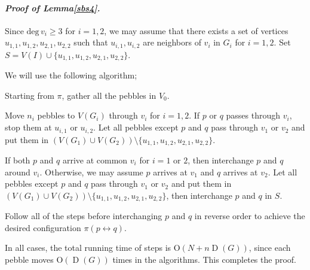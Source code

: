 \documentclass[letter,11pt]{article}
\newcommand{\white}{\qquad{\framebox{\rule{0pt}{4pt}}}}
\newcommand{\owari}{\hfill\white}
\theoremstyle{definition}
\theoremstyle{definition}
\DeclareMathOperator{\D}{D}
\newcommand{\1}{\boldmath$~1~$\unboldmath}
\newcommand{\Ord}{\mathrm{O}}
\newcommand{\qedgo}{\vspace{0.35cm}}
\newcommand{\tume}{\hspace*{0.2em}}
\def\deg{\textrm{deg}}
\newcommand{\maru}[1]{{\ooalign{\hfill$\small#1$\hfill\crcr\scalebox{1.3}{$\bigcirc$}}}}
\newenvironment{alg-enumerate}{%
  \begin{enumerate}%
   \renewcommand{\theenumi}{\arabic{enumi}}%
   \renewcommand{\labelenumi}{\rm{{\maru{\theenumi}}\tume\/}}%
   \renewcommand{\labelenumii}{\rm{$(${\maru{\theenumi}}-\theenumii$)$\tume\/}}%
 }{\end{enumerate}%
}
\newenvironment{Proofof}[1]{\expandafter
\paragraph{{\it Proof of #1.}}}{\hspace{5mm}\owari\qedgo}
\begin{document}
\begin{Proofof}{Lemma\tume\ref{sbs4}}
Since $\deg \, v_i \ge 3$ for $i=1,2$, we may assume that there exists a set of vertices $u_{1,1}, u_{1,2}, u_{2,1}, u_{2,2}$ such that $u_{i,1}, u_{i,2}$ are neighbors of $v_i$ in $G_i$ for $i=1,2$.
Set $S = V(I) \cup \{ u_{1,1}, u_{1,2}, u_{2,1}, u_{2,2} \}$.

We will use the following algorithm;
\begin{alg-enumerate}
\item Starting from $\pi$, gather all the pebbles in $V_0$.
\item Move $n_i$ pebbles to $V(G_i)$ through $v_i$ for $i=1,2$.
If $p$ or $q$ passes through $v_i$, stop them at $u_{i,1}$ or $u_{i,2}$.
Let all pebbles except $p$ and $q$ pass through $v_1$ or $v_2$ and put them in $(V(G_1) \cup V(G_2))\setminus \{ u_{1,1}, u_{1,2}, u_{2,1}, u_{2,2} \}$.
\item If both $p$ and $q$ arrive at common $v_i$ for $i=1$ or $2$, then interchange $p$ and $q$ around $v_i$.  
Otherwise, we may assume $p$ arrives at $v_1$ and $q$ arrives at $v_2$.
Let all pebbles except $p$ and $q$ pass through $v_1$ or $v_2$ and put them in $(V(G_1) \cup V(G_2))\setminus \{ u_{1,1}, u_{1,2}, u_{2,1}, u_{2,2} \}$, then interchange $p$ and $q$ in $S$.
\item Follow all of the steps before interchanging $p$ and $q$ in reverse order to achieve the desired configuration $\pi(p\leftrightarrow q)$.
\end{alg-enumerate}
In all cases, the total running time of steps is $\Ord(N + n\D(G))$, since each pebble moves $\Ord(\D(G))$ times in the algorithms.
This completes the proof.
\end{Proofof}

\end{document}
